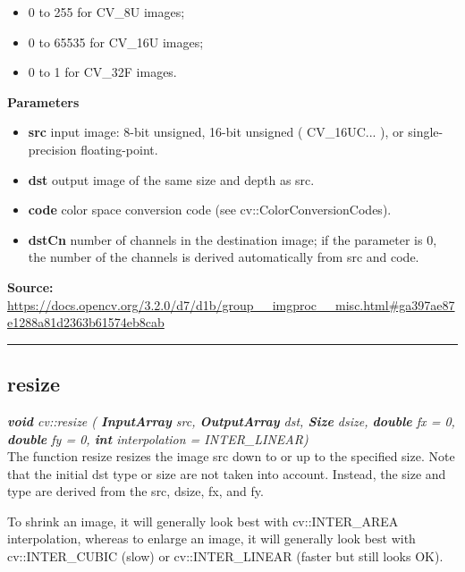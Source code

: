 \begin{itemize}
    \item 0 to 255 for CV\_8U images;
    \item 0 to 65535 for CV\_16U images;
    \item 0 to 1 for CV\_32F images.
\end{itemize}

\textbf{Parameters}
\begin{itemize}
    \item \textbf{src} input image: 8-bit unsigned, 16-bit unsigned ( CV\_16UC... ), or single-precision floating-point.
    \item \textbf{dst} output image of the same size and depth as src.
    \item \textbf{code} color space conversion code (see cv::ColorConversionCodes).
    \item \textbf{dstCn} number of channels in the destination image; if the parameter is 0, the number of the channels is derived automatically from src and code.
\end{itemize}
   
\textbf{Source:} \url{https://docs.opencv.org/3.2.0/d7/d1b/group__imgproc__misc.html#ga397ae87e1288a81d2363b61574eb8cab}

\noindent\rule{\textwidth}{0.5pt}
		

\subsection*{resize}
\label{subsec:opencv_appendix_used_functions_resize}

\textit{\textbf{void} cv::resize (
        \textbf{InputArray} src,
		\textbf{OutputArray}  	dst,
		\textbf{Size}  	dsize,
		\textbf{double}  	fx = 0,
		\textbf{double}  	fy = 0,
		\textbf{int}  	interpolation = INTER\_LINEAR)}\\
		
The function resize resizes the image src down to or up to the specified size. Note that the initial dst type or size are not taken into account. Instead, the size and type are derived from the src, dsize, fx, and fy.

To shrink an image, it will generally look best with cv::INTER\_AREA interpolation, whereas to enlarge an image, it will generally look best with cv::INTER\_CUBIC (slow) or cv::INTER\_LINEAR (faster but still looks OK).\\

